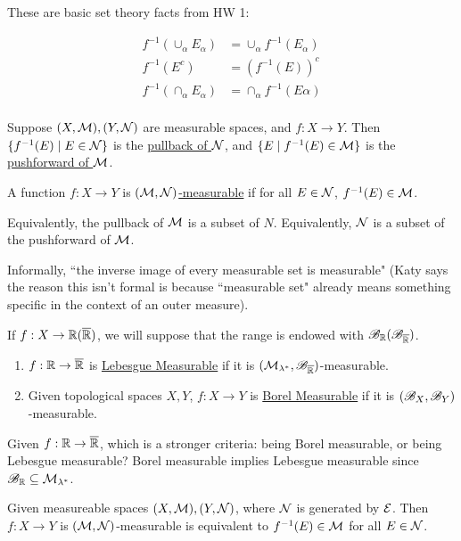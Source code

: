 \documentclass[x11names,reqno,14pt]{extarticle}
\begin{document}
These are basic set theory facts from HW 1:

\begin{align*}
f^{-1}(\cup_{\alpha}E_\alpha) & = \cup_{\alpha}f^{-1}(E_\alpha) \\
f^{-1}(E^c) & = (f^{-1}(E))^c \\
f^{-1}(\cap_\alpha E_\alpha ) & = \cap_\alpha f^{-1}(E\alpha) \\
\end{align*}


Suppose $(X, \mathcal{M}), (Y, \mathcal{N})$ are measurable spaces, and $f:X\to Y$. Then $\{f^{-1}(E) \mid E \in \mathcal{N}\}$ is the \underline{pullback of $\mathcal{N}$}, and $\{E \mid f^{-1}(E) \in \mathcal{M}\}$ is the \underline{pushforward of $\mathcal{M}$}. 


A function $f:X\to Y$ is \underline{$(\mathcal{M}, \mathcal{N})$-measurable} if for all $E \in \mathcal{N}$, $f^{-1}(E) \in \mathcal{M}$. 

Equivalently, the pullback of $\mathcal{M}$ is a subset of $N$. Equivalently, $\mathcal{N}$ is a subset of the pushforward of $\mathcal{M}$.

Informally, ``the inverse image of every measurable set is measurable" (Katy says the reason this isn't formal is because ``measurable set" already means something specific in the context of an outer measure). 

If $f:X\to \mathbb{R} (\overline{\mathbb{R}})$, we will suppose that the range is endowed with $\mathscr{B}_{\mathbb{R}} (\mathscr{B}_{\overline{\mathbb{R}}})$. 


\begin{enumerate}[label=(\alph*)]
\item $f:\mathbb{R}\to\overline{\mathbb{R}}$ is \underline{Lebesgue Measurable} if it is $(\mathcal{M}_{\lambda^*}, \mathscr{B}_{\overline{\mathbb{R}}})$-measurable. 
\item Given topological spaces $X, Y$, $f:X\to Y$ is \underline{Borel Measurable} if it is $(\mathscr{B}_X, \mathscr{B}_Y)$-measurable. 
\end{enumerate}

\rem Given $f:\mathbb{R}\to\overline{\mathbb{R}}$, which is a stronger criteria: being Borel measurable, or being Lebesgue measurable? Borel measurable implies Lebesgue measurable since $\mathscr{B}_{\mathbb{R}} \subseteq \mathcal{M}_{\lambda^*}$. 

\prop

Given measureable spaces $(X, \mathcal{M}), (Y, \mathcal{N})$, where $\mathcal{N}$ is generated by $\mathcal{E}$. Then $f:X\to Y$ is $(\mathcal{M}, \mathcal{N})$-measurable is equivalent to $f^{-1}(E) \in \mathcal{M}$ for all $E \in \mathcal{N}$. 
\end{document}
